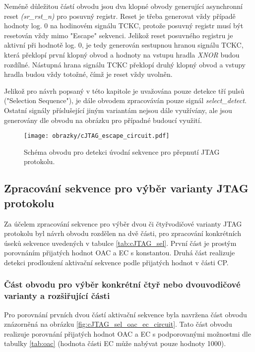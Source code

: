 Neméně důležitou částí obvodu jsou dva klopné obvody generující asynchronní reset \textit{(sr\_rst\_n)} pro posuvný registr. Reset je třeba generovat vždy případě hodnoty log. 0 na hodinovém signálu TCKC, protože posuvný registr musí být resetován vždy mimo "Escape" sekvenci. Jelikož reset posuvného registru je aktivní při hodnotě log. 0, je tedy generován sestupnou hranou signálu TCKC, která překlopí první klopný obvod a hodnoty na vstupu hradla \textit{XNOR} budou rozdílné. Nástupná hrana signálu TCKC překlopí druhý klopný obvod a vstupy hradla budou vždy totožné, čímž je reset vždy uvolněn.

Jelikož pro návrh popsaný v této kapitole je uvažována pouze detekce tří pulsů ("Selection Sequence"), je dále obvodem zpracováván pouze signál \textit{select\_detect}. Ostatní signály příslušející jiným variantám nejsou dále využívány, ale jsou generovány dle obvodu na obrázku pro případné budoucí využití.

\begin{figure}[!h]
  \begin{center}
    \texttt{[image: obrazky/cJTAG\_escape\_circuit.pdf]}
  \end{center}
  \caption{Schéma obvodu pro detekci úvodní sekvence pro přepnutí JTAG protokolu.}
	\label{fig:cJTAG_escape_circuit}
\end{figure}

\subsection{Zpracování sekvence pro výběr varianty JTAG protokolu}	\label{subsec:sel_seq_det}
Za účelem zpracování sekvence pro výběr dvou či čtyřvodičové varianty \acs{JTAG} protokolu byl návrh obvodu rozdělen na dvě části, pro zpracování konkrétních úseků sekvence uvedených v tabulce \ref{tab:cJTAG_sel}. První část je prostým porovnáním přijatých hodnot \acs{OAC} a \acs{EC} s konstantou. Druhá část realizuje detekci prodloužení aktivační sekvence podle přijatých hodnot v části \acs{CP}.

\subsubsection{Část obvodu pro výběr konkrétní čtyř nebo dvouvodičové varianty a rozšiřující části}
Pro porovnání prvních dvou částí aktivační sekvence byla navržena část obvodu znázorněná na obrázku \ref{fig:cJTAG_sel_oac_ec_circuit}. Tato část obvodu realizuje porovnání přijatých hodnot \acs{OAC} a \acs{EC} s podporovanými možnostmi dle tabulky \ref{tab:oac} (hodnota části \acs{EC} může nabývat pouze hodnoty 1000).

